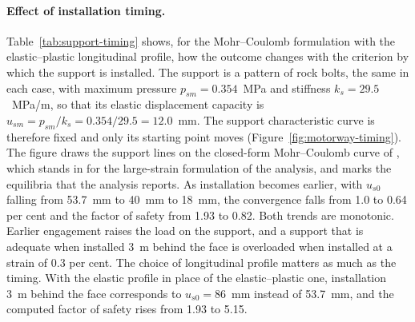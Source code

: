 \paragraph{Effect of installation timing.}
Table~\ref{tab:support-timing} shows, for the Mohr--Coulomb formulation with
the elastic--plastic longitudinal profile, how the outcome changes with the
criterion by which the support is installed. The support is a pattern of rock
bolts, the same in each case, with maximum pressure $p_{sm} = 0.354$~MPa and
stiffness $k_s = 29.5$~MPa/m, so that its elastic displacement capacity is
$u_{sm} = p_{sm}/k_s = 0.354/29.5 = 12.0$~mm. The support characteristic
curve is therefore fixed and only its starting point moves
(Figure~\ref{fig:motorway-timing}). The figure draws the support lines on
the closed-form Mohr--Coulomb curve of \citet{duncanfama1993}, which stands
in for the large-strain formulation of the analysis, and marks the equilibria
that the analysis reports. As installation
becomes earlier, with $u_{s0}$ falling from 53.7~mm to 40~mm to 18~mm, the
convergence falls from 1.0 to 0.64 per cent and the factor of safety from
1.93 to 0.82. Both trends are monotonic. Earlier engagement raises the load
on the support, and a support that is adequate when installed 3~m behind the
face is overloaded when installed at a strain of 0.3 per cent. The choice of
longitudinal profile matters as much as the timing. With the elastic profile
in place of the elastic--plastic one, installation 3~m behind the face
corresponds to $u_{s0} = 86$~mm instead of 53.7~mm, and the computed factor
of safety rises from 1.93 to 5.15.

